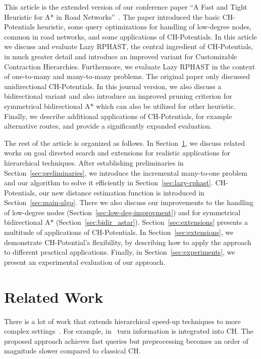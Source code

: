 \documentclass[manuscript,review]{acmart}
\begin{document}
This article is the extended version of our conference paper ``A Fast and Tight Heuristic for A* in Road Networks''~\cite{strasser_et_al:LIPIcs.SEA.2021.6}.
The paper introduced the basic CH-Potentials heuristic, some query optimizations for handling of low-degree nodes, common in road networks, and some applications of CH-Potentials.
In this article we discuss and evaluate Lazy RPHAST, the central ingredient of CH-Potentials, in much greater detail and introduce an improved variant for Customizable Contraction Hierarchies.
Furthermore, we evaluate Lazy RPHAST in the context of one-to-many and many-to-many problems.
The original paper only discussed unidirectional CH-Potentials.
In this journal version, we also discuss a bidirectional variant and also introduce an improved pruning criterion for symmetrical bidirectional A* which can also be utilized for other heuristic.
Finally, we describe additional applications of CH-Potentials, for example alternative routes, and provide a significantly expanded evaluation.

The rest of the article is organized as follows.
In Section~\ref{sec:related_work}, we discuss related works on goal directed search and extensions for realistic applications for hierarchical techniques.
After establishing preliminaries in Section~\ref{sec:preliminaries}, we introduce the incremental many-to-one problem and our algorithm to solve it efficiently in Section~\ref{sec:lazy-rphast}.
CH-Potentials, our new distance estimation function is introduced in Section~\ref{sec:main-algo}.
There we also discuss our improvements to the handling of low-degree nodes (Section~\ref{sec:low-deg-improvment}) and for symmetrical bidirectional A* (Section~\ref{sec:bidir_astar}).
Section~\ref{sec:extensions} presents a multitude of applications of CH-Potentials.
In Section~\ref{sec:extensions}, we demonstrate CH-Potential's flexibility, by describing how to apply the approach to different practical applications.
Finally, in Section~\ref{sec:experiments}, we present an experimental evaluation of our approach.

\section{Related Work}\label{sec:related_work}

There is a lot of work that extends hierarchical speed-up techniques to more complex settings~\cite{bdgmpsww-rptn-16}.
For example, in~\cite{gv-errnt-11} turn information is integrated into CH.
The proposed approach achieves fast queries but preprocessing becomes an order of magnitude slower compared to classical CH.
\end{document}
